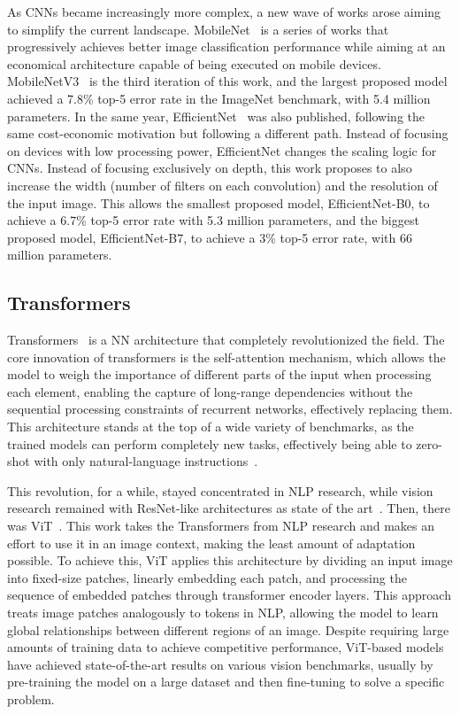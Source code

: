 As \glspl{CNN} became increasingly more complex, a new wave of works arose aiming to simplify the current landscape. MobileNet~\cite{howard2017mobilenetsefficientconvolutionalneural,8578572,howard_searching_2019} is a series of works that progressively achieves better image classification performance while aiming at an economical architecture capable of being executed on mobile devices. MobileNetV3~\cite{howard_searching_2019} is the third iteration of this work, and the largest proposed model achieved a 7.8\% top-5 error rate in the ImageNet benchmark, with 5.4 million parameters. In the same year, EfficientNet~\cite{tan_efficientnet_2019} was also published, following the same cost-economic motivation but following a different path. Instead of focusing on devices with low processing power, EfficientNet changes the scaling logic for \glspl{CNN}. Instead of focusing exclusively on depth, this work proposes to also increase the width (number of filters on each convolution) and the resolution of the input image. This allows the smallest proposed model, EfficientNet-B0, to achieve a 6.7\% top-5 error rate with 5.3 million parameters, and the biggest proposed model, EfficientNet-B7, to achieve a 3\% top-5 error rate, with 66 million parameters.

\subsection{Transformers}

Transformers~\cite{vaswani_attention_2023} is a \gls{NN} architecture that completely revolutionized the field. The core innovation of transformers is the self-attention mechanism, which allows the model to weigh the importance of different parts of the input when processing each element, enabling the capture of long-range dependencies without the sequential processing constraints of recurrent networks, effectively replacing them. This architecture stands at the top of a wide variety of benchmarks, as the trained models can perform completely new tasks, effectively being able to zero-shot with only natural-language instructions~\cite{kojima_large_2022}.

This revolution, for a while, stayed concentrated in \gls{NLP} research, while vision research remained with ResNet-like architectures as state of the art~\cite{dosovitskiy_image_2021}. Then, there was ViT~\cite{dosovitskiy_image_2021}. This work takes the Transformers from \gls{NLP} research and makes an effort to use it in an image context, making the least amount of adaptation possible. To achieve this, \gls{ViT} applies this architecture by dividing an input image into fixed-size patches, linearly embedding each patch, and processing the sequence of embedded patches through transformer encoder layers. This approach treats image patches analogously to tokens in \gls{NLP}, allowing the model to learn global relationships between different regions of an image. Despite requiring large amounts of training data to achieve competitive performance, ViT-based models have achieved state-of-the-art results on various vision benchmarks, usually by pre-training the model on a large dataset and then fine-tuning to solve a specific problem.

